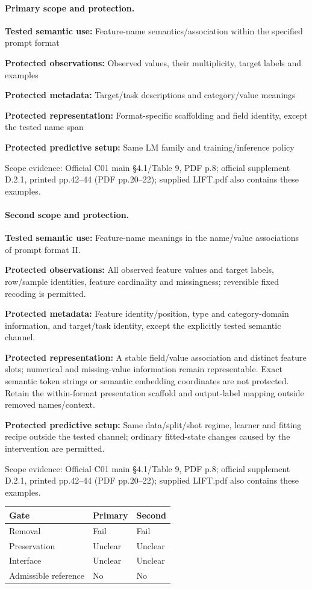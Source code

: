 \documentclass[10pt]{article}
\begin{document}
\paragraph{Primary scope and protection.}
\textbf{Tested semantic use:} Feature-name semantics/association within the specified prompt format\par
\textbf{Protected observations:} Observed values, their multiplicity, target labels and examples\par
\textbf{Protected metadata:} Target/task descriptions and category/value meanings\par
\textbf{Protected representation:} Format-specific scaffolding and field identity, except the tested name span\par
\textbf{Protected predictive setup:} Same LM family and training/inference policy\par
Scope evidence: Official C01 main §4.1/Table 9, PDF p.8; official supplement D.2.1, printed pp.42--44 (PDF pp.20--22); supplied LIFT.pdf also contains these examples.\par
\paragraph{Second scope and protection.}
\textbf{Tested semantic use:} Feature-name meanings in the name/value associations of prompt format II.\par
\textbf{Protected observations:} All observed feature values and target labels, row/sample identities, feature cardinality and missingness; reversible fixed recoding is permitted.\par
\textbf{Protected metadata:} Feature identity/position, type and category-domain information, and target/task identity, except the explicitly tested semantic channel.\par
\textbf{Protected representation:} A stable field/value association and distinct feature slots; numerical and missing-value information remain representable. Exact semantic token strings or semantic embedding coordinates are not protected. Retain the within-format presentation scaffold and output-label mapping outside removed names/context.\par
\textbf{Protected predictive setup:} Same data/split/shot regime, learner and fitting recipe outside the tested channel; ordinary fitted-state changes caused by the intervention are permitted.\par
Scope evidence: Official C01 main §4.1/Table 9, PDF p.8; official supplement D.2.1, printed pp.42--44 (PDF pp.20--22); supplied LIFT.pdf also contains these examples.\par
\begin{tabular}{lll}\toprule Gate & Primary & Second \\ \midrule
Removal & Fail & Fail \\
Preservation & Unclear & Unclear \\
Interface & Unclear & Unclear \\
Admissible reference & No & No \\
\bottomrule\end{tabular}
\end{document}
